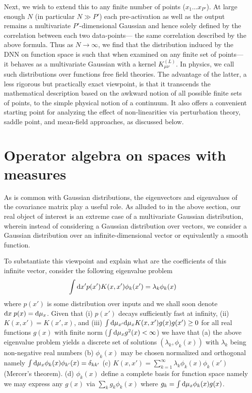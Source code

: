 Next, we wish to extend this to any finite number of points ($x_1...x_{P'}$). At large enough $N$ (in particular $N \gg P'$) each pre-activation as well as the output remains a multivariate $P'$-dimensional Gaussian and hence solely defined by the correlation between each two data-points--- the same correlation described by the above formula. Thus as $N\rightarrow \infty$, we find that the distribution induced by the DNN on function space is such that when examined on any finite set of points--- it behaves as a multivariate Gaussian with a kernel $K^{(L)}_{\mu \nu}$. In physics, we call such distributions over functions free field theories. The advantage of the latter, a less rigorous but practically exact viewpoint, is that it transcends the mathematical description based on the awkward notion of all possible finite sets of points, to the simple physical notion of a continuum. It also offers a convenient starting point for analyzing the effect of non-linearities via perturbation theory, saddle point, and mean-field approaches, as discussed below. 

\section{Operator algebra on spaces with measures}
\label{Sec:Intro_Measure}
As is common with Gaussian distributions, the eigenvectors and eigenvalues of the covariance matrix play a useful role. As alluded to in the above section, our real object of interest is an extreme case of a multivariate Gaussian distribution, wherein instead of considering a Gaussian distribution over vectors, we consider a Gaussian distribution over an infinite-dimensional vector or equivalently a smooth function. 

To substantiate this viewpoint and explain what are the coefficients of this infinite vector, consider the following eigenvalue problem 
\begin{align}
\label{Eq:EigenvalueEquation}
\int \text{d} x' p(x') K(x,x') \phi_{k}(x') &= \lambda_k \phi_k(x)  
\end{align}
where $p(x')$ is some distribution over inputs and we shall soon denote $\text{d} x \; p(x)=\text{d} \mu_x$. Given that (i) $p(x')$ decays sufficiently fast at infinity, (ii) $K(x,x')=K(x',x)$, and (iii) $\int \text{d} \mu_{x'} \text{d}\mu_x K(x,x') g(x) g(x') \geq 0$ for all real functions $g(x)$ with finite norm ($\int \text{d} \mu_x g^2(x) < \infty$) we have that (a) the above eigenvalue problem yields a discrete set of solutions $(\lambda_k,\phi_k(x))$ with $\lambda_k$ being non-negative real numbers (b) $\phi_k(x)$ may be chosen normalized and orthogonal namely $\int \text{d}\mu_x \phi_{k}(x) \phi_{k'}(x)=\delta_{kk'}$ (c) $K(x,x')=\sum_{k=1}^{\infty} \lambda_k \phi_k(x) \phi_k(x')$ (Mercer's theorem). (d) $\phi_k(x)$ define a complete basis for function space namely we may express any $g(x)$ via $\sum_k g_k \phi_k(x)$ where $g_k = \int \text{d}\mu_x \phi_k(x) g(x)$. 


